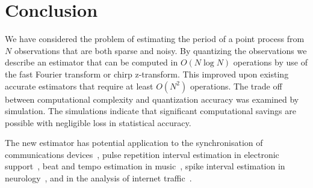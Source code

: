 \documentclass[10pt,twocolumn,twoside]{IEEEtran}
\begin{document}
 

\section{Conclusion}

We have considered the problem of estimating the period of a point process from $N$ observations that are both sparse and noisy.  By quantizing the observations we describe an estimator that can be computed in $O(N\log N)$ operations by use of the fast Fourier transform or chirp z-transform.  This improved upon existing accurate estimators that require at least $O(N^2)$ operations.  The trade off between computational complexity and quantization accuracy was examined by simulation.  The simulations indicate that significant computational savings are possible with negligible loss in statistical accuracy.

The new estimator has potential application to the synchronisation of communications devices~\cite{Fogel1988,Fogel1989_bit_synch_zero_crossings}, pulse repetition interval estimation in electronic support~\cite{EltonGray_puilse_train_rader_1994,Gray_more_pri_1994,Clarkson_thesis,clarkson_estimate_period_pulse_train_1996,Hauochan_pri_2012}, beat and tempo estimation in music~\cite{dixon_beat_extraction_2001}, spike interval estimation in neurology~\cite{Arnett_neuro_pri_1976,Brillinger_spike_trains_1988,Rossoni200630}, and in the analysis of internet traffic~\cite{He_detecting_periodic_patterns_in_internet_2006,5585849,5947313}.


\small

\end{document}
